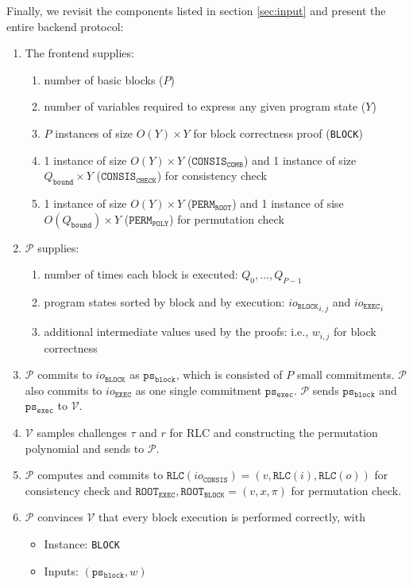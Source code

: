 \documentclass{article}
\newcommand{\code}{\texttt}
\newcommand{\Qbound}{Q_{\mathtt{bound}}}
\renewcommand{\P}{\mathcal{P}}
\newcommand{\V}{\mathcal{V}}
\newcommand{\RLC}{\mathtt{RLC}}
\newcommand{\ioc}{io_{\mathtt{CONSIS}}}
\newcommand{\iob}{io_{\mathtt{BLOCK}}}
\newcommand{\ioe}{io_{\mathtt{EXEC}}}
\newcommand{\ROOTE}{\mathtt{ROOT_{EXEC}}}
\newcommand{\ROOTB}{\mathtt{ROOT_{BLOCK}}}
\newcommand{\psb}{\mathtt{ps_{block}}}
\newcommand{\pse}{\mathtt{ps_{exec}}}
\begin{document}
Finally, we revisit the components listed in section \ref{sec:input} and present the entire backend protocol:
\begin{enumerate}
    \item The frontend supplies:
    \begin{enumerate}
        \item number of basic blocks ($P$)
        \item number of variables required to express any given program state ($Y$)
        \item $P$ instances of size $O(Y)\times Y$ for block correctness proof (\code{BLOCK})
        \item 1 instance of size $O(Y) \times Y$ ($\mathtt{CONSIS}_\mathtt{COMB}$) and 1 instance of size $\Qbound \times Y$ ($\mathtt{CONSIS}_\mathtt{CHECK}$) for consistency check
        \item 1 instance of size $O(Y) \times Y$ ($\mathtt{PERM}_\mathtt{ROOT}$) and 1 instance of sise $O(\Qbound) \times Y$ ($\mathtt{PERM}_\mathtt{POLY}$) for permutation check
    \end{enumerate}
    \item $\P$ supplies:
    \begin{enumerate}
        \item number of times each block is executed: $Q_0, \dots, Q_{P - 1}$
        \item program states sorted by block and by execution: ${\iob}_{i, j}$ and ${\ioe}_i$
        \item additional intermediate values used by the proofs: i.e., $w_{i, j}$ for block correctness
    \end{enumerate}
    \item $\P$ commits to $\iob$ as $\psb$, which is consisted of $P$ small commitments. $\P$ also commits to $\ioe$ as one single commitment $\pse$. $\P$ sends $\psb$ and $\pse$ to $\V$.
    \item $\V$ samples challenges $\tau$ and $r$ for RLC and constructing the permutation polynomial and sends to $\P$.
    \item $\P$ computes and commits to $\RLC(\ioc) = (v, \RLC(i), \RLC(o))$ for consistency check and $\ROOTE, \ROOTB = (v, x, \pi)$ for permutation check.
    \item $\P$ convinces $\V$ that every block execution is performed correctly, with
    \begin{itemize}
        \item Instance: \code{BLOCK}
        \item Inputs: $(\psb, w)$

\end{itemize}
\end{enumerate}
\end{document}
